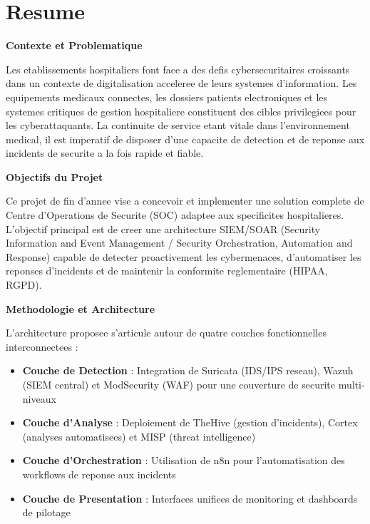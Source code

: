 \chapter*{Resume}

\vspace{1cm}

\textbf{Contexte et Problematique}

Les etablissements hospitaliers font face a des defis cybersecuritaires croissants dans un contexte de digitalisation acceleree de leurs systemes d'information. Les equipements medicaux connectes, les dossiers patients electroniques et les systemes critiques de gestion hospitaliere constituent des cibles privilegiees pour les cyberattaquants. La continuite de service etant vitale dans l'environnement medical, il est imperatif de disposer d'une capacite de detection et de reponse aux incidents de securite a la fois rapide et fiable.

\vspace{0.5cm}

\textbf{Objectifs du Projet}

Ce projet de fin d'annee vise a concevoir et implementer une solution complete de Centre d'Operations de Securite (SOC) adaptee aux specificites hospitalieres. L'objectif principal est de creer une architecture SIEM/SOAR (Security Information and Event Management / Security Orchestration, Automation and Response) capable de detecter proactivement les cybermenaces, d'automatiser les reponses d'incidents et de maintenir la conformite reglementaire (HIPAA, RGPD).

\vspace{0.5cm}

\textbf{Methodologie et Architecture}

L'architecture proposee s'articule autour de quatre couches fonctionnelles interconnectees :

\begin{itemize}
    \item \textbf{Couche de Detection} : Integration de Suricata (IDS/IPS reseau), Wazuh (SIEM central) et ModSecurity (WAF) pour une couverture de securite multi-niveaux
    \item \textbf{Couche d'Analyse} : Deploiement de TheHive (gestion d'incidents), Cortex (analyses automatisees) et MISP (threat intelligence)
    \item \textbf{Couche d'Orchestration} : Utilisation de n8n pour l'automatisation des workflows de reponse aux incidents
    \item \textbf{Couche de Presentation} : Interfaces unifiees de monitoring et dashboards de pilotage
\end{itemize}

